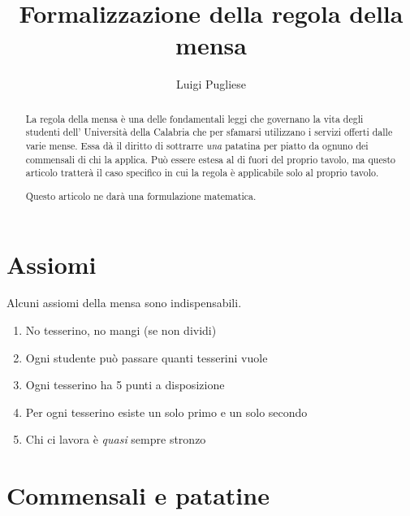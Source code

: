 \documentclass[a4paper,12pt]{article}
\begin{document}
    \newtheorem*{osservazione}{Osservazione}
    \newtheorem*{definizione}{Definizione}
    \newtheorem*{notazione}{Notazione}
    \newtheorem{proposizione}{Proposizione}[section]
    \newtheorem{corollario}{Corollario}[proposizione]
    \title{Formalizzazione della regola della mensa}
    \author{Luigi Pugliese}
    \maketitle
    \begin{abstract}
        La regola della mensa è una delle fondamentali leggi che governano la vita degli studenti dell' Università della Calabria che per sfamarsi utilizzano i servizi offerti dalle varie mense.
        Essa dà il diritto di sottrarre \emph{una} patatina per piatto da ognuno dei commensali di chi la applica. Può essere estesa al di fuori del proprio tavolo, ma questo articolo tratterà il caso specifico
        in cui la regola è applicabile solo al proprio tavolo.

        Questo articolo ne darà una formulazione matematica.
    \end{abstract}
    \newpage
    \renewcommand\contentsname{Contenuti}
    \renewcommand\proofname{Dimostrazione}
    \tableofcontents{}
    \newpage
    \section{Assiomi}
    Alcuni assiomi della mensa sono indispensabili.
    \begin{enumerate}
        \item No tesserino, no mangi (se non dividi)
        \item Ogni studente può passare quanti tesserini vuole
        \item Ogni tesserino ha 5 punti a disposizione
        \item Per ogni tesserino esiste un solo primo e un solo secondo
        \item Chi ci lavora è \emph{quasi} sempre stronzo
    \end{enumerate}
    \newpage
    \section{Commensali e patatine}
\end{document}
